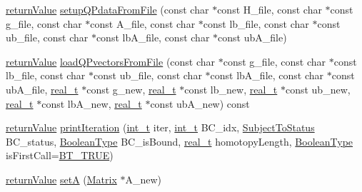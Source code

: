 \begin{DoxyCompactItemize}
\item 
\hyperlink{_message_handling_8hpp_a81d556f613bfbabd0b1f9488c0fa865e}{return\+Value} \hyperlink{class_q_problem_a080fb229af9e97e338a543de442315d5}{setup\+Q\+Pdata\+From\+File} (const char $\ast$const H\+\_\+file, const char $\ast$const g\+\_\+file, const char $\ast$const A\+\_\+file, const char $\ast$const lb\+\_\+file, const char $\ast$const ub\+\_\+file, const char $\ast$const lb\+A\+\_\+file, const char $\ast$const ub\+A\+\_\+file)
\item 
\hyperlink{_message_handling_8hpp_a81d556f613bfbabd0b1f9488c0fa865e}{return\+Value} \hyperlink{class_q_problem_a987e8eaf2dd08828340f3f1012b22606}{load\+Q\+Pvectors\+From\+File} (const char $\ast$const g\+\_\+file, const char $\ast$const lb\+\_\+file, const char $\ast$const ub\+\_\+file, const char $\ast$const lb\+A\+\_\+file, const char $\ast$const ub\+A\+\_\+file, \hyperlink{qp_o_a_s_e_s__wrapper_8h_a0d00e2b3dfadee81331bbb39068570c4}{real\+\_\+t} $\ast$const g\+\_\+new, \hyperlink{qp_o_a_s_e_s__wrapper_8h_a0d00e2b3dfadee81331bbb39068570c4}{real\+\_\+t} $\ast$const lb\+\_\+new, \hyperlink{qp_o_a_s_e_s__wrapper_8h_a0d00e2b3dfadee81331bbb39068570c4}{real\+\_\+t} $\ast$const ub\+\_\+new, \hyperlink{qp_o_a_s_e_s__wrapper_8h_a0d00e2b3dfadee81331bbb39068570c4}{real\+\_\+t} $\ast$const lb\+A\+\_\+new, \hyperlink{qp_o_a_s_e_s__wrapper_8h_a0d00e2b3dfadee81331bbb39068570c4}{real\+\_\+t} $\ast$const ub\+A\+\_\+new) const
\item 
\hyperlink{_message_handling_8hpp_a81d556f613bfbabd0b1f9488c0fa865e}{return\+Value} \hyperlink{class_q_problem_ac272cb4f93e9d2897ce67d90ad167dbf}{print\+Iteration} (\hyperlink{_types_8hpp_ab6fd6105e64ed14a0c9281326f05e623}{int\+\_\+t} iter, \hyperlink{_types_8hpp_ab6fd6105e64ed14a0c9281326f05e623}{int\+\_\+t} B\+C\+\_\+idx, \hyperlink{_types_8hpp_a70a6a40d261a015ead8d43aa589383a4}{Subject\+To\+Status} B\+C\+\_\+status, \hyperlink{_types_8hpp_a20f82124c82b6f5686a7fce454ef9089}{Boolean\+Type} B\+C\+\_\+is\+Bound, \hyperlink{qp_o_a_s_e_s__wrapper_8h_a0d00e2b3dfadee81331bbb39068570c4}{real\+\_\+t} homotopy\+Length, \hyperlink{_types_8hpp_a20f82124c82b6f5686a7fce454ef9089}{Boolean\+Type} is\+First\+Call=\hyperlink{_types_8hpp_a20f82124c82b6f5686a7fce454ef9089a34c57965bfb07125b09326a69019f9c6}{B\+T\+\_\+\+T\+R\+UE})
\item 
\hyperlink{_message_handling_8hpp_a81d556f613bfbabd0b1f9488c0fa865e}{return\+Value} \hyperlink{class_q_problem_afd392ee6cbfa4dd00d4941c51939e777}{setA} (\hyperlink{class_matrix}{Matrix} $\ast$A\+\_\+new)
\item 

\end{DoxyCompactItemize}
